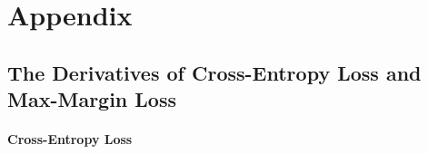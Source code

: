 \documentclass[letterpaper]{article} %
\begin{document}



\clearpage 

\appendix


\section{Appendix}
\subsection{The Derivatives of Cross-Entropy Loss and Max-Margin Loss }
\paragraph{Cross-Entropy Loss}\label{appendix:CE_loss}
\end{document}
